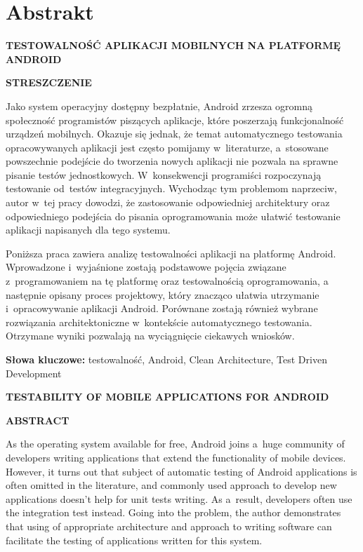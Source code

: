 \chapter*{Abstrakt}
\label{abstract}

\begin{center}
\textbf{TESTOWALNOŚĆ APLIKACJI MOBILNYCH NA PLATFORMĘ ANDROID}

\textbf{STRESZCZENIE}
\end{center}

Jako system operacyjny dostępny bezpłatnie, Android zrzesza ogromną społeczność programistów piszących aplikacje, które poszerzają funkcjonalność urządzeń mobilnych. Okazuje się jednak, że temat automatycznego testowania opracowywanych aplikacji jest często pomijamy w~literaturze, a~stosowane powszechnie podejście do tworzenia nowych aplikacji nie pozwala na sprawne pisanie testów jednostkowych. W~konsekwencji programiści rozpoczynają testowanie od~testów integracyjnych. Wychodząc tym problemom naprzeciw, autor w~tej pracy dowodzi, że zastosowanie odpowiedniej architektury oraz odpowiedniego podejścia do pisania oprogramowania może ułatwić testowanie aplikacji napisanych dla tego systemu.  

Poniższa praca zawiera analizę testowalności aplikacji na platformę Android. Wprowadzone i~wyjaśnione zostają podstawowe pojęcia związane z~programowaniem na tę platformę oraz testowalnością oprogramowania, a następnie opisany proces projektowy, który znacząco ułatwia utrzymanie i~opracowywanie aplikacji Android. Porównane zostają również wybrane rozwiązania architektoniczne w~kontekście automatycznego testowania. Otrzymane wyniki pozwalają na wyciągnięcie ciekawych wniosków.

\textbf{Słowa kluczowe:} testowalność, Android, Clean Architecture, Test Driven Development

\begin{center}
\textbf{TESTABILITY OF MOBILE APPLICATIONS FOR ANDROID}

\textbf{ABSTRACT}
\end{center}

As the operating system available for free, Android joins a~huge community of developers writing applications that extend the functionality of mobile devices. However, it turns out that subject of automatic testing of Android applications is often omitted in the literature, and commonly used approach to develop new applications doesn't help for unit tests writing. As a~result, developers often use the integration test instead. Going into the problem, the author demonstrates that using of appropriate architecture and approach to writing software can facilitate the testing of applications written for this system.

